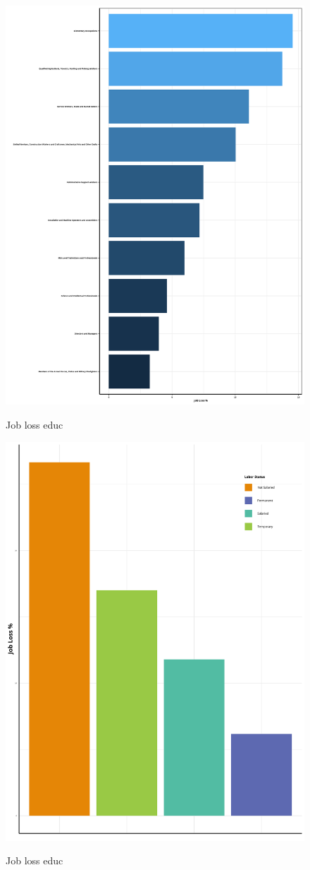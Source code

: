 \documentclass[a4paper]{article}
\begin{document}
\begin{figure}[hb]
  \centering
  \caption{Job loss educ}
  \includegraphics[width=0.85\linewidth]{../analysis/output/graph/_graph_job_loss_occupation.png}
  \label{fig:_graph_job_loss_occupation}
\end{figure}

\begin{figure}[hb]
  \centering
  \caption{Job loss educ}
  \includegraphics[width=0.85\linewidth]{../analysis/output/graph/_graph_job_loss_work_arrangement.png}
  \label{fig:_graph_job_loss_work_arrangement}
\end{figure}
\end{document}
